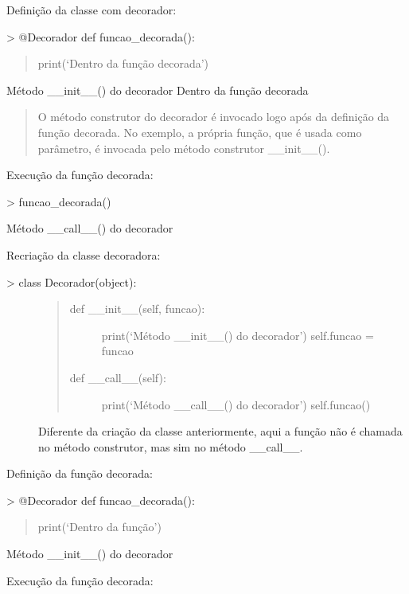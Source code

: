 \documentclass[letterpaper,10pt,brazil]{sphinxmanual}
\begin{document}
Definição da classe com decorador:

\textgreater{} @Decorador
def funcao\_decorada():
\begin{quote}

print(‘Dentro da função decorada’)
\end{quote}

Método \_\_init\_\_() do decorador
Dentro da função decorada
\begin{quote}

O método construtor do decorador é invocado logo após da definição da função decorada.
No exemplo, a própria função, que é usada como parâmetro, é invocada pelo método construtor \_\_init\_\_().
\end{quote}

Execução da função decorada:

\textgreater{} funcao\_decorada()

Método \_\_call\_\_() do decorador

Recriação da classe decoradora:
\begin{description}
\item[{\textgreater{} class Decorador(object):}] \leavevmode\begin{quote}
\begin{description}
\item[{def \_\_init\_\_(self, funcao):}] \leavevmode
print(‘Método \_\_init\_\_() do decorador’)
self.funcao = funcao

\item[{def \_\_call\_\_(self):}] \leavevmode
print(‘Método \_\_call\_\_() do decorador’)
self.funcao()

\end{description}
\end{quote}

Diferente da criação da classe anteriormente, aqui a função não é chamada no método construtor, mas sim no método \_\_call\_\_.

\end{description}

Definição da função decorada:

\textgreater{} @Decorador
def funcao\_decorada():
\begin{quote}

print(‘Dentro da função’)
\end{quote}

Método \_\_init\_\_() do decorador

Execução da função decorada:
\end{document}
